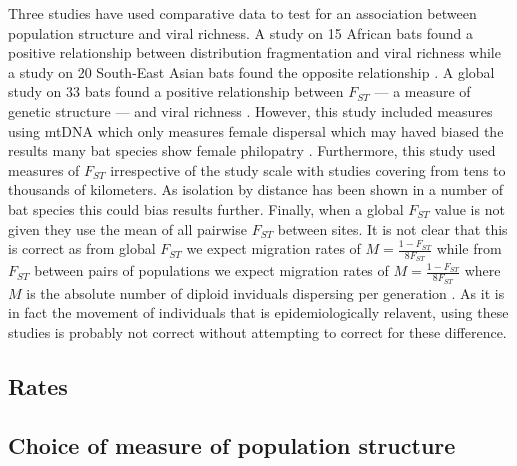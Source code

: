 Three studies have used comparative data to test for an association between population structure and viral richness.
A study on 15 African bats found a positive relationship between distribution fragmentation and viral richness \cite{maganga2014bat} while a study on 20 South-East Asian bats found the opposite relationship \cite{gay2014parasite}. 
A global study on 33 bats found a positive relationship between $F_{ST}$ --- a measure of genetic structure --- and viral richness \cite{turmelle2009correlates}. 
However, this study included measures using mtDNA which only measures female dispersal which may haved biased the results many bat species show female philopatry \cite{kerth2002extreme, hulva2010mechanisms}.
Furthermore, this study used measures of $F_{ST}$ irrespective of the study scale with studies covering from tens \cite{mccracken1981social} to thousands \cite{petit1999male} of kilometers.
As isolation by distance has been shown in a number of bat species \cite{burland1999population, hulva2010mechanisms, o2015genetic, vonhof2015range} this could bias results further.
Finally, when a global $F_{ST}$ value is not given they use the mean of all pairwise $F_{ST}$ between sites.
It is not clear that this is correct as from global $F_{ST}$ we expect migration rates of $M = \frac{1-F_{ST}}{8F_{ST}}$ while from $F_{ST}$ between pairs of populations we expect migration rates of $M = \frac{1-F_{ST}}{8F_{ST}}$ where $M$ is the absolute number of diploid inviduals dispersing per generation \cite{slatkin1995measure}.
As it is in fact the movement of individuals that is epidemiologically relavent, using these studies is probably not correct without attempting to correct for these difference.



\subsection{Rates}



\subsection{Choice of measure of population structure}









